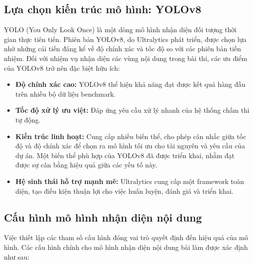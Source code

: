 \subsection{Lựa chọn kiến trúc mô hình: YOLOv8}
YOLO (You Only Look Once) là một dòng mô hình nhận diện đối tượng thời gian thực tiên tiến. Phiên bản YOLOv8, do Ultralytics phát triển, được chọn lựa nhờ những cải tiến đáng kể về độ chính xác và tốc độ so với các phiên bản tiền nhiệm. Đối với nhiệm vụ nhận diện các vùng nội dung trong bài thi, các ưu điểm của YOLOv8 trở nên đặc biệt hữu ích:
\begin{itemize}
    \item \textbf{Độ chính xác cao:} YOLOv8 thể hiện khả năng đạt được kết quả hàng đầu trên nhiều bộ dữ liệu benchmark.
    \item \textbf{Tốc độ xử lý ưu việt:} Đáp ứng yêu cầu xử lý nhanh của hệ thống chấm thi tự động.
    \item \textbf{Kiến trúc linh hoạt:} Cung cấp nhiều biến thể, cho phép cân nhắc giữa tốc độ và độ chính xác để chọn ra mô hình tối ưu cho tài nguyên và yêu cầu của dự án. Một biến thể phù hợp của YOLOv8 đã được triển khai, nhằm đạt được sự cân bằng hiệu quả giữa các yếu tố này.
    \item \textbf{Hệ sinh thái hỗ trợ mạnh mẽ:} Ultralytics cung cấp một framework toàn diện, tạo điều kiện thuận lợi cho việc huấn luyện, đánh giá và triển khai.
\end{itemize}

\subsection{Cấu hình mô hình nhận diện nội dung}
\label{subsec:model_config_content_final}
Việc thiết lập các tham số cấu hình đóng vai trò quyết định đến hiệu quả của mô hình. Các cấu hình chính cho mô hình nhận diện nội dung bài làm được xác định như sau:

